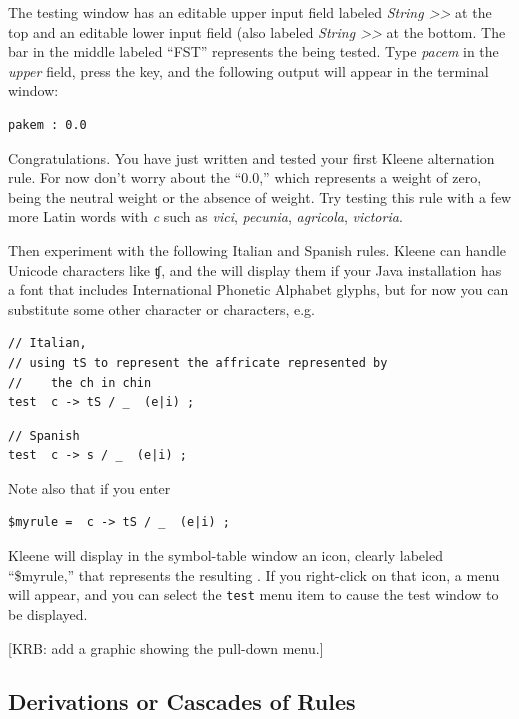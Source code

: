 The testing window has an editable upper input field labeled
\emph{String >>} at the top and an editable lower input field (also
labeled \emph{String >>} at the bottom.  The
bar in the middle labeled ``FST'' represents the \fst{} being tested.  Type \emph{pacem} in the \emph{upper} field,
press the  key, and the following output will appear in the  terminal window:


\begin{Verbatim}
pakem : 0.0
\end{Verbatim}

\noindent
Congratulations.  You have just written
and tested your first Kleene alternation rule.  For now don't worry about the ``0.0,'' which
represents a weight of zero, being the neutral weight
or the absence of weight.    Try testing this rule with a few more Latin words with \emph{c} such as
\emph{vici}, \emph{pecunia},
\emph{agricola}, \emph{victoria}.

Then experiment with the following Italian and Spanish rules.  Kleene can handle Unicode characters
like ʧ, and the  will display them if your Java installation has a font
that includes International Phonetic Alphabet glyphs, but for now you can substitute some other character or characters, e.g.


\begin{Verbatim}
// Italian, 
// using tS to represent the affricate represented by 
//    the ch in chin
test  c -> tS / _  (e|i) ;
\end{Verbatim}

\begin{Verbatim}
// Spanish
test  c -> s / _  (e|i) ;
\end{Verbatim}


\noindent
Note also that if you enter

\begin{Verbatim}
$myrule =  c -> tS / _  (e|i) ;
\end{Verbatim}

\noindent
Kleene will display in the symbol-table window an icon, clearly labeled ``\$myrule,'' that represents the resulting
\fst{}.  If you right-click on that icon, a menu will appear, and you can select the \texttt{test} menu item to
cause the test window to be displayed.

[KRB:  add a graphic showing the pull-down menu.]

\subsection{Derivations or Cascades of Rules}

